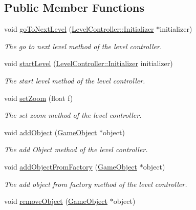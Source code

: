 \subsection*{Public Member Functions}
\begin{DoxyCompactItemize}
\item 
void \hyperlink{class_level_controller_a9cb1f95fee01739d9658801dfebb43b1}{go\+To\+Next\+Level} (\hyperlink{class_level_controller_1_1_initializer}{Level\+Controller\+::\+Initializer} $\ast$initializer)
\begin{DoxyCompactList}\small\item\em The go to next level method of the level controller. \end{DoxyCompactList}\item 
void \hyperlink{class_level_controller_a0b8f10e66f7b97615c92340e10f77a07}{start\+Level} (\hyperlink{class_level_controller_1_1_initializer}{Level\+Controller\+::\+Initializer} initializer)
\begin{DoxyCompactList}\small\item\em The start level method of the level controller. \end{DoxyCompactList}\item 
void \hyperlink{class_level_controller_a1235128f78023483b022bab8e2b0125c}{set\+Zoom} (float f)
\begin{DoxyCompactList}\small\item\em The set zoom method of the level controller. \end{DoxyCompactList}\item 
void \hyperlink{class_level_controller_a230987fb618cc9949974a4f4b994bbc1}{add\+Object} (\hyperlink{class_game_object}{Game\+Object} $\ast$object)
\begin{DoxyCompactList}\small\item\em The add Object method of the level controller. \end{DoxyCompactList}\item 
void \hyperlink{class_level_controller_afd60c294955bc06dafac9f5ea146c53d}{add\+Object\+From\+Factory} (\hyperlink{class_game_object}{Game\+Object} $\ast$object)
\begin{DoxyCompactList}\small\item\em The add object from factory method of the level controller. \end{DoxyCompactList}\item 
void \hyperlink{class_level_controller_ad8894683730d484c0ba359c0ee88b219}{remove\+Object} (\hyperlink{class_game_object}{Game\+Object} $\ast$object)

\end{DoxyCompactItemize}
